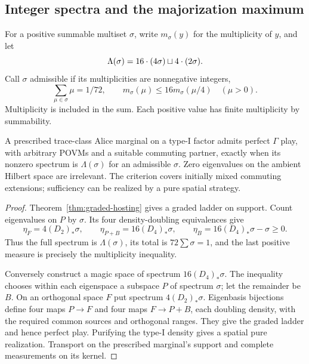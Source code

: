 \subsection{Integer spectra and the majorization maximum}\label{sec:spectra}
For a positive summable multiset $\sigma$, write $m_\sigma(y)$ for the multiplicity of $y$, and let
\[
 \Lambda(\sigma)=16\mathbin{\cdot}(4\sigma)\sqcup4\mathbin{\cdot}(2\sigma).
\]
Call $\sigma$ admissible if its multiplicities are nonnegative integers,
\begin{equation}\label{eq:admissible-spectrum}
 \sum_{\mu\in\sigma}\mu=1/72,\qquad
 m_\sigma(\mu)\le16m_\sigma(\mu/4)\quad(\mu>0).
\end{equation}
Multiplicity is included in the sum. Each positive value has finite multiplicity by summability.

\begin{theorem}\label{thm:spectrum-classification}
A prescribed trace-class Alice marginal on a type-I factor admits perfect $\Gamma$ play, with arbitrary POVMs and a suitable commuting partner, exactly when its nonzero spectrum is $\Lambda(\sigma)$ for an admissible $\sigma$. Zero eigenvalues on the ambient Hilbert space are irrelevant. The criterion covers initially mixed commuting extensions; sufficiency can be realized by a pure spatial strategy.
\end{theorem}
\begin{proof}
Theorem~\ref{thm:graded-hosting} gives a graded ladder on support. Count eigenvalues on $P$ by $\sigma$. Its four density-doubling equivalences give
\[
 \eta_F=4(D_2)_*\sigma,\qquad
 \eta_{P+B}=16(D_4)_*\sigma,\qquad
 \eta_B=16(D_4)_*\sigma-\sigma\ge0.
\]
Thus the full spectrum is $\Lambda(\sigma)$, its total is $72\sum\sigma=1$, and the last positive measure is precisely the multiplicity inequality.

Conversely construct a magic space of spectrum $16(D_4)_*\sigma$. The inequality chooses within each eigenspace a subspace $P$ of spectrum $\sigma$; let the remainder be $B$. On an orthogonal space $F$ put spectrum $4(D_2)_*\sigma$. Eigenbasis bijections define four maps $P\to F$ and four maps $F\to P+B$, each doubling density, with the required common sources and orthogonal ranges. They give the graded ladder and hence perfect play. Purifying the type-I density gives a spatial pure realization. Transport on the prescribed marginal's support and complete measurements on its kernel.
\end{proof}

